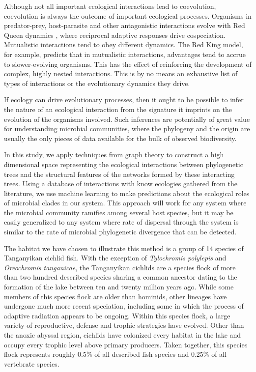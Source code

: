 Although not all important ecological interactions lead to coevolution, coevolution is always the outcome of important ecological processes. Organisms in predator-prey, host-parasite and other antagonistic interactions evolve with Red Queen dynamics \cite{van1973new}, where reciprocal adaptive responses drive cospeciation. Mutualistic interactions tend to obey different dynamics. The Red King model, \cite{bergstrom2003red, gokhale2012mutualism} for example, predicts that in mutualistic interactions, advantages tend to accrue to slower-evolving organisms. This has the effect of reinforcing the development of complex, highly nested interactions. \cite{bastolla2009architecture, rezende2007non} This is by no means an exhaustive list of types of interactions or the evolutionary dynamics they drive. 

If ecology can drive evolutionary processes, then it ought to be possible to infer the nature of an ecological interaction from the signature it imprints on the evolution of the organisms involved. Such inferences are potentially of great value for understanding microbial communities, where the phylogeny and the origin are usually the only pieces of data available for the bulk of observed biodiversity.

In this study, we apply techniques from graph theory to construct a high dimensional space representing the ecological interactions between phylogenetic trees and the structural features of the networks formed by these interacting trees. Using a database of interactions with know ecologies gathered from the literature, we use machine learning to make predictions about the ecological roles of microbial clades in our system. This approach will work for any system where the microbial community ramifies among several host species, but it may be easily generalized to any system where rate of dispersal through the system is similar to the rate of microbial phylogenetic divergence that can be detected. 

The habitat we have chosen to illustrate this method is a group of 14 species of Tanganyikan cichlid fish. With the exception of {\em Tylochromis polylepis} and {\em Oreochromis tanganicae}, the Tanganyikan cichlids are a species flock of more than two hundred described species sharing a common ancestor dating to the formation of the lake between ten and twenty million years ago. While some members of this species flock are older than hominids, other lineages have undergone much more recent speciation, including some in which the process of adaptive radiation appears to be ongoing. Within this species flock, a large variety of reproductive, defense and trophic strategies have evolved. Other than the anoxic abyssal region, cichlids have colonized every habitat in the lake and occupy every trophic level above primary producers. Taken together, this species flock represents roughly 0.5\% of all described fish species and 0.25\% of all vertebrate species.